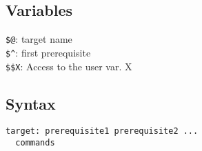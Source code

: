 \subsection{Variables}
\verb|$@|: target name\\
\verb|$^|: first prerequisite\\
\verb|$$X|: Access to the user var. X\\

\subsection{Syntax}
\begin{verbatim}
target: prerequisite1 prerequisite2 ...
  commands
\end{verbatim}
